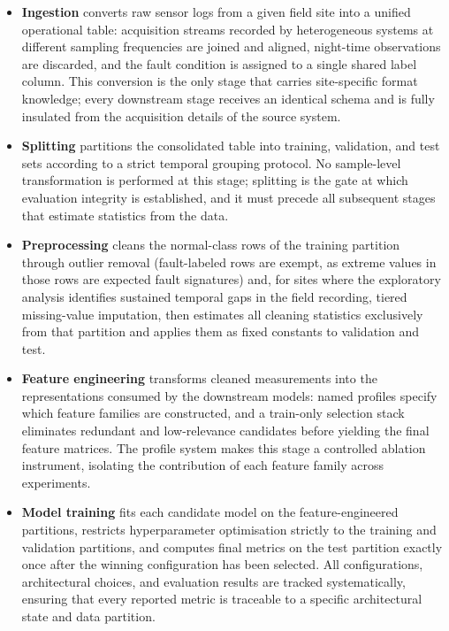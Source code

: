 \begin{itemize}
    \item \textbf{Ingestion} converts raw sensor logs from a given field site into a unified operational table: acquisition streams recorded by heterogeneous systems at different sampling frequencies are joined and aligned, night-time observations are discarded, and the fault condition is assigned to a single shared label column. This conversion is the only stage that carries site-specific format knowledge; every downstream stage receives an identical schema and is fully insulated from the acquisition details of the source system.
    \item \textbf{Splitting} partitions the consolidated table into training, validation, and test sets according to a strict temporal grouping protocol. No sample-level transformation is performed at this stage; splitting is the gate at which evaluation integrity is established, and it must precede all subsequent stages that estimate statistics from the data.
    \item \textbf{Preprocessing} cleans the normal-class rows of the training partition through outlier removal (fault-labeled rows are exempt, as extreme values in those rows are expected fault signatures) and, for sites where the exploratory analysis identifies sustained temporal gaps in the field recording, tiered missing-value imputation, then estimates all cleaning statistics exclusively from that partition and applies them as fixed constants to validation and test.    
    \item \textbf{Feature engineering} transforms cleaned measurements into the representations consumed by the downstream models: named profiles specify which feature families are constructed, and a train-only selection stack eliminates redundant and low-relevance candidates before yielding the final feature matrices. The profile system makes this stage a controlled ablation instrument, isolating the contribution of each feature family across experiments.    
    \item \textbf{Model training} fits each candidate model on the feature-engineered partitions, restricts hyperparameter optimisation strictly to the training and validation partitions, and computes final metrics on the test partition exactly once after the winning configuration has been selected. All configurations, architectural choices, and evaluation results are tracked systematically, ensuring that every reported metric is traceable to a specific architectural state and data partition.
\end{itemize}

